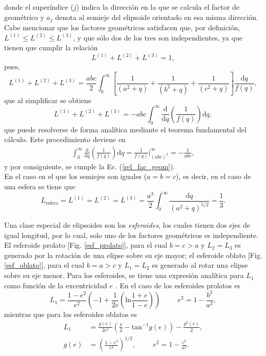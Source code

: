 donde el superíndice ($j$) indica la dirección en la que se calcula el factor de geométrico y $a_j$ denota al semieje del elipsoide orientado en esa misma dirección. Cabe mencionar que los factores geométricos  satisfacen que, por definición, $L^{(1)}\leq L^{(2)}\leq L^{(3)}$, y que sólo dos de los tres son independientes, ya que tienen que cumplir la relación 
\begin{equation}
    L^{(1)}+L^{(2)}+L^{(3)}=1,
    \label{rel_fac_geom}
\end{equation}
pues, 
\begin{equation*}
	L^{(1)}+L^{(2)}+L^{(3)}=\frac{abc}{2}\int_0^{\infty}\left[\frac{1}{(a^2+q)}+\frac{1}{(b^2+q)}+\frac{1}{(c^2+q)}\right]\frac{\text{d}q}{f(q)},
\end{equation*}
que al simplificar se obtiene
$$L^{(1)}+L^{(2)}+L^{(3)}=-abc\int_0^{\infty}\frac{\text{d}}{\text{d}q}\left(\frac{1}{f(q)}\right)\text{d}q,$$
que puede resolverse de forma analítica mediante el teorema fundamental del cálculo. Este procedimiento deviene en
\begin{align*}
	\int_0^{\infty}\frac{\text{d}}{\text{d}q}\left(\frac{1}{f(q)}\right)\text{d}q=\frac{1}{f(q)}\Big|_{(abc)^2}^{\infty}=-\frac{1}{abc},
\end{align*}
y por consiguiente, se cumple la Ec. (\ref{rel_fac_geom}).\\

\noindent En el caso en el que los semiejes son iguales ($a=b=c$), es decir, en el caso de una esfera se tiene que
\begin{equation*}
    L_{\text{esfera}}=L^{(1)}=L^{(2)}=L^{(3)}=\frac{a^3}{2}\int_0^{\infty}\frac{\text{d}q}{(a^2+q)^{5/2}}=\frac{1}{3}.
\end{equation*}

Una clase especial de elipsoides son los \textit{esferoides}, los cuales tienen dos ejes de igual longitud, por lo cual, solo uno de los factores geométricos es independiente. El esferoide prolato [Fig. \ref{esf_prolato}], para el cual $b=c>a$ y $L_2=L_3$ es generado por la rotación de una elipse sobre su eje mayor; el esferoide oblato [Fig. \ref{esf_oblato}], para el cual $b=a>c$ y $L_1=L_2$ es generado al rotar una elipse sobre su eje menor. Para los esferoides, se tiene una expresión analítica para $L_1$ como función de la excentricidad $e$ \cite{Bohren}. En el caso de los esferoides prolatos es
\begin{equation}
	L_1=\frac{1-e^2}{e^2}\left(-1+\frac{1}{2e}\left(\text{ln}\frac{1+e}{1-e}\right)\right)\hspace{1cm}e^2=1-\frac{b^2}{a^2},
\end{equation}
mientras que para los esferoides oblatos es
    \begin{align}
        L_1&=\frac{g(e)}{2e^2}\left(\frac{\pi}{2}-\mbox{tan}^{-1}g(e)\right)-\frac{g^2(e)}{2},\\
        g(e)&=\left(\frac{1-e^2}{e^2}\right)^{1/2},\hspace{1cm}e^2=1-\frac{c^2}{a^2}.
    \end{align}

